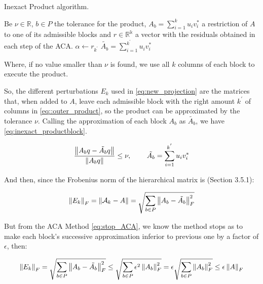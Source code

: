\begin{algorithm}
    \caption{Inexact Product algorithm.}\label{alg:inexact_product}
    \begin{algorithmic}[1]
        \State Be $\nu \in \mathbb{R}$, $b \in P$ the tolerance for the product,  $A_{b}= \sum_{i=1}^{k}u_{i}v_{i}^{*}$ a restriction of $A$ to one of its admissible blocks and $r \in \mathbb{R^{k}}$ a vector with the residuals obtained in each step of the ACA.
        \State $\alpha \leftarrow r_{k^{'}}$
        \If{$\alpha \leq \nu$}
        \State $\tilde{A_{b}}=\sum_{i=1}^{k^{'}}u_{i}v_{i}^{*}$
        \EndIf
        \EndFor

    \end{algorithmic}
\end{algorithm}

Where, if no value smaller than $\nu$ is found, we use all $k$ columns of each block to execute the product.

So, the different perturbations $E_{k}$ used in \ref{eq:new_projection} are the matrices that, when added to $A$, leave each admissible block with the right amount $k^{'}$ of columns in \ref{eq::outer_product}, so the product can be approximated by the tolerance $\nu$. Calling the approximation of each block $A_{b}$ as $\tilde{A_{b}}$, we have \ref{eq:inexact_productblock}.

\begin{equation}\label{eq:inexact_productblock}
    \frac{\left\lVert A_{b}q - \tilde{A_{b}}q \right\rVert}{\left\lVert A_{b}q\right\rVert} \leq \nu, \hspace{0.3in} \tilde{A_{b}} = \sum_{i=1} ^{k^{'}} u_{i} v_{i} ^{*}
\end{equation}


And then, since the Frobenius norm of the hierarchical matrix is \cite{hackbusch2015hierarchical}(Section 3.5.1):

\begin{equation}
    \left\lVert E_{k}\right\rVert_{F}= \left\lVert\mathcal{A}_{k} - A\right\rVert = \sqrt{\sum_{b \in P} \left\lVert A_{b} - \tilde{A_{b}}\right\rVert_{F}^{2} }
\end{equation}

But from the ACA Method \ref{eq:stop_ACA}, we know the method stops as to make each block's successive approximation inferior to previous one by a factor of $\epsilon$, then:

\begin{equation}
    \left\lVert E_{k}\right\rVert_{F} = \sqrt{\sum_{b \in P} \left\lVert A_{b} - \tilde{A_{b}}\right\rVert_{F}^{2} } \leq \sqrt{\sum_{b\in P}\epsilon^{2}\left\lVert A_{b}\right\rVert_{F}^{2}} = \epsilon \sqrt{\sum_{b \in P}\left\lVert A_{b}\right\rVert_{F}^{2}}
    \leq \epsilon \left\lVert A\right\rVert_{F}
\end{equation}


